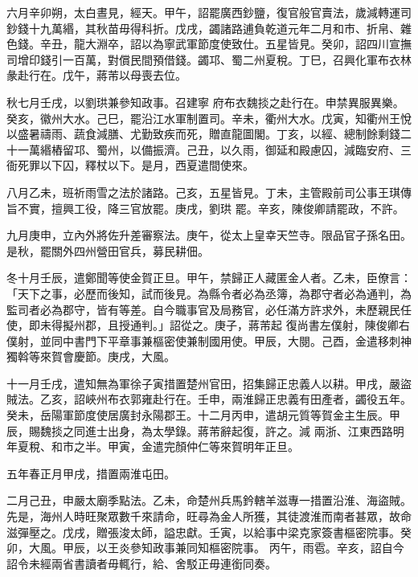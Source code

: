 \begin{pinyinscope}
 六月辛卯朔，太白晝見，經天。甲午，詔罷廣西鈔鹽，復官般官賣法，歲減轉運司鈔錢十九萬緡，其秋苗毋得科折。戊戌，蠲諸路逋負乾道元年二月和市、折帛、雜色錢。辛丑，龍大淵卒，詔以為寧武軍節度使致仕。五星皆見。癸卯，詔四川宣撫司增印錢引一百萬，對償民間預借錢。蠲邛、蜀二州夏稅。丁巳，召興化軍布衣林彖赴行在。戊午，蔣芾以母喪去位。



 秋七月壬戌，以劉珙兼參知政事。召建寧
 府布衣魏掞之赴行在。申禁異服異樂。癸亥，徽州大水。己巳，罷沿江水軍制置司。辛未，衢州大水。戊寅，知衢州王悅以盛暑禱雨、蔬食減膳、尤勤致疾而死，贈直龍圖閣。丁亥，以經、總制餘剩錢二十一萬緡樁留邛、蜀州，以備振濟。己丑，以久雨，御延和殿慮囚，減臨安府、三衙死罪以下囚，釋杖以下。是月，西夏遣間使來。



 八月乙未，班祈雨雪之法於諸路。己亥，五星皆見。丁未，主管殿前司公事王琪傳旨不實，擅興工役，降三官放罷。庚戌，劉珙
 罷。辛亥，陳俊卿請罷政，不許。



 九月庚申，立內外將佐升差審察法。庚午，從太上皇幸天竺寺。限品官子孫名田。是秋，罷關外四州營田官兵，募民耕佃。



 冬十月壬辰，遣鄭聞等使金賀正旦。甲午，禁歸正人藏匿金人者。乙未，臣僚言：「天下之事，必歷而後知，試而後見。為縣令者必為丞簿，為郡守者必為通判，為監司者必為郡守，皆有等差。自今職事官及局務官，必任滿方許求外，未歷親民任使，即未得擬州郡，且授通判。」詔從之。庚子，蔣芾起
 復尚書左僕射，陳俊卿右僕射，並同中書門下平章事兼樞密使兼制國用使。甲辰，大閱。己酉，金遣移刺神獨斡等來賀會慶節。庚戌，大風。



 十一月壬戌，遣知無為軍徐子寅措置楚州官田，招集歸正忠義人以耕。甲戌，嚴盜賊法。乙亥，詔峽州布衣郭雍赴行在。壬申，兩淮歸正忠義有田產者，蠲役五年。癸未，岳陽軍節度使居廣封永陽郡王。十二月丙申，遣胡元質等賀金主生辰。甲辰，賜魏掞之同進士出身，為太學錄。蔣芾辭起復，許之。減
 兩浙、江東西路明年夏稅、和市之半。甲寅，金遣完顏仲仁等來賀明年正旦。



 五年春正月甲戌，措置兩淮屯田。



 二月己丑，申嚴太廟季點法。乙未，命楚州兵馬鈐轄羊滋專一措置沿淮、海盜賊。先是，海州人時旺聚眾數千來請命，旺尋為金人所獲，其徒渡淮而南者甚眾，故命滋彈壓之。戊戌，贈張浚太師，謚忠獻。壬寅，以給事中梁克家簽書樞密院事。癸卯，大風。甲辰，以王炎參知政事兼同知樞密院事。
 丙午，雨雹。辛亥，詔自今詔令未經兩省書讀者毋輒行，給、舍駁正毋連銜同奏。




\end{pinyinscope}
